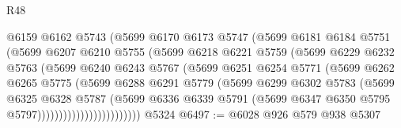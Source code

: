\begin{lexlean}{R48}
\begin{coremodule}
                          @6159
                          @6162
                          @5743
                          (@5699
                            @6170
                            @6173
                            @5747
                            (@5699
                              @6181
                              @6184
                              @5751
                              (@5699
                                @6207
                                @6210
                                @5755
                                (@5699
                                  @6218
                                  @6221
                                  @5759
                                  (@5699
                                    @6229
                                    @6232
                                    @5763
                                    (@5699
                                      @6240
                                      @6243
                                      @5767
                                      (@5699
                                        @6251
                                        @6254
                                        @5771
                                        (@5699
                                          @6262
                                          @6265
                                          @5775
                                          (@5699
                                            @6288
                                            @6291
                                            @5779
                                            (@5699
                                              @6299
                                              @6302
                                              @5783
                                              (@5699
                                                @6325
                                                @6328
                                                @5787
                                                (@5699
                                                  @6336
                                                  @6339
                                                  @5791
                                                  (@5699
                                                    @6347
                                                    @6350
                                                    @5795
                                                    @5797))))))))))))))))))))))))
    @5324
@6497 := @6028 @926 @579 @938 @5307

\end{coremodule}
\end{lexlean}

